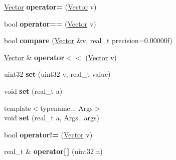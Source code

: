 \begin{DoxyCompactItemize}
\item 
\hypertarget{classetk_1_1_vector_ab1d80b27412c4a4e4c5db82deaf93a5a}{\hyperlink{classetk_1_1_vector}{Vector} {\bfseries operator=} (\hyperlink{classetk_1_1_vector}{Vector} v)}\label{classetk_1_1_vector_ab1d80b27412c4a4e4c5db82deaf93a5a}

\item 
\hypertarget{classetk_1_1_vector_a7467a01d00015cfccacbdeca107dc224}{bool {\bfseries operator==} (\hyperlink{classetk_1_1_vector}{Vector} v)}\label{classetk_1_1_vector_a7467a01d00015cfccacbdeca107dc224}

\item 
\hypertarget{classetk_1_1_vector_aabd2758f5e256f7467ee4bbc632d9a04}{bool {\bfseries compare} (\hyperlink{classetk_1_1_vector}{Vector} \&v, real\-\_\-t precision=0.\-00000f)}\label{classetk_1_1_vector_aabd2758f5e256f7467ee4bbc632d9a04}

\item 
\hypertarget{classetk_1_1_vector_a15fc3f99b711d1b17920c658a204b783}{\hyperlink{classetk_1_1_vector}{Vector} \& {\bfseries operator$<$$<$} (\hyperlink{classetk_1_1_vector}{Vector} v)}\label{classetk_1_1_vector_a15fc3f99b711d1b17920c658a204b783}

\item 
\hypertarget{classetk_1_1_vector_a793a60ded702fe9ea3213e035ce12eba}{uint32 {\bfseries set} (uint32 v, real\-\_\-t value)}\label{classetk_1_1_vector_a793a60ded702fe9ea3213e035ce12eba}

\item 
\hypertarget{classetk_1_1_vector_a3090ae1eca76c56e8985b042885d6a28}{void {\bfseries set} (real\-\_\-t a)}\label{classetk_1_1_vector_a3090ae1eca76c56e8985b042885d6a28}

\item 
\hypertarget{classetk_1_1_vector_a1671c31013cdfa7ba0dc92fe393d0f8d}{{\footnotesize template$<$typename... Args$>$ }\\void {\bfseries set} (real\-\_\-t a, Args...\-args)}\label{classetk_1_1_vector_a1671c31013cdfa7ba0dc92fe393d0f8d}

\item 
\hypertarget{classetk_1_1_vector_a7bafdba4ca50aa40d06dfd6fd99db339}{bool {\bfseries operator!=} (\hyperlink{classetk_1_1_vector}{Vector} v)}\label{classetk_1_1_vector_a7bafdba4ca50aa40d06dfd6fd99db339}

\item 
\hypertarget{classetk_1_1_vector_a1b9cc9f89a9cdbd7679fb2013216e422}{real\-\_\-t \& {\bfseries operator\mbox{[}$\,$\mbox{]}} (uint32 n)}\label{classetk_1_1_vector_a1b9cc9f89a9cdbd7679fb2013216e422}


\end{DoxyCompactItemize}
